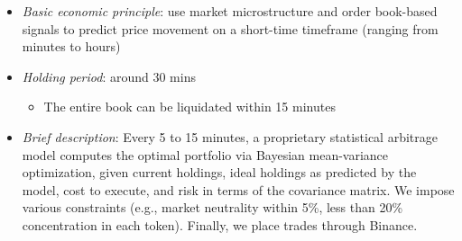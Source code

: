 \documentclass[11pt, letterpaper]{article}
\providecommand{\tightlist}{%
\setlength{\itemsep}{0pt}
\setlength{\parskip}{0pt}}
\begin{document}
\begin{itemize}
    \item \emph{Basic economic principle}: use market microstructure and
      order book-based signals to predict price movement on a short-time
      timeframe (ranging from minutes to hours)

    \item \emph{Holding period}: around 30 mins

      \begin{itemize}
        \tightlist

        \item The entire book can be liquidated within 15 minutes
      \end{itemize}

    \item \emph{Brief description}: Every 5 to 15 minutes, a proprietary
      statistical arbitrage model computes the optimal portfolio via Bayesian
      mean-variance optimization, given current holdings, ideal holdings as
      predicted by the model, cost to execute,
      and risk in terms of the covariance matrix. We impose various constraints
      (e.g., market neutrality within 5\%, less than 20\% concentration in
      each token). Finally, we place trades through Binance.
  \end{itemize}
\end{document}
